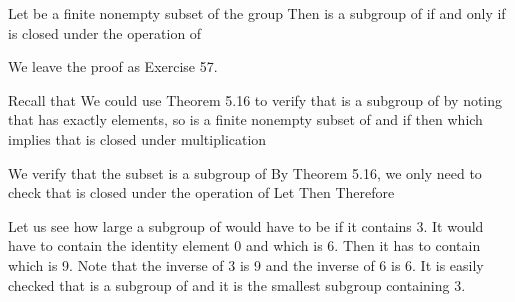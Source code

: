 \documentclass[11pt,oneside]{article}
\begin{document}
\begin{BookBody}

 Let  be a finite nonempty subset of the group  Then  is a subgroup of  if and only if  is closed under the operation of 

 We leave the proof as Exercise 57. \BookEnd{\blacklozenge}

 Recall that  We could use Theorem 5.16 to verify that  is a subgroup of  by noting that  has exactly  elements, so  is a finite nonempty subset of  and if  then  which implies that  is closed under multiplication\BookEnd{\blacktriangle}

 We verify that the subset  is a subgroup of  By Theorem 5.16, we only need to check that  is closed under the operation of  Let  Then  Therefore \BookEnd{\blacktriangle}


\noindent Let us see how large a subgroup  of  would have to be if it contains 3. It would have to contain the identity element 0 and  which is 6. Then it has to contain  which is 9. Note that the inverse of 3 is 9 and the inverse of 6 is 6. It is easily checked that  is a subgroup of  and it is the smallest subgroup containing 3.


\end{BookBody}
\end{document}
